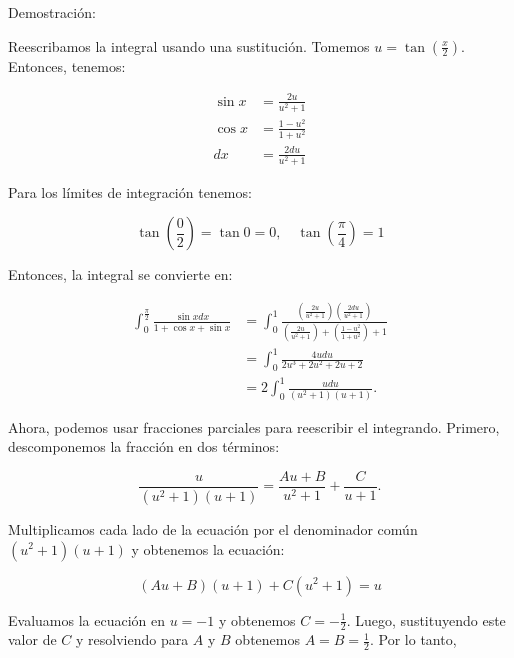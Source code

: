\documentclass{report}
\begin{document}
\begin{enumerate}
        Demostración:
        
        Reescribamos la integral usando una sustitución. Tomemos $u=\tan \left(\frac{x}{2}\right)$. Entonces, tenemos:
        
        $$
        \begin{aligned}
        \sin x & =\frac{2 u}{u^{2}+1} \\
        \cos x & =\frac{1-u^{2}}{1+u^{2}} \\
        d x & =\frac{2 d u}{u^{2}+1}
        \end{aligned}
        $$
        
        Para los límites de integración tenemos:
        
        $$
        \tan \left(\frac{0}{2}\right)=\tan 0=0, \quad \tan \left(\frac{\pi}{4}\right)=1
        $$
        
        Entonces, la integral se convierte en:
        
        $$
        \begin{aligned}
        \int_{0}^{\frac{\pi}{2}} \frac{\sin x d x}{1+\cos x+\sin x} & =\int_{0}^{1} \frac{\left(\frac{2 u}{u^{2}+1}\right)\left(\frac{2 d u}{u^{2}+1}\right)}{\left(\frac{2 u}{u^{2}+1}\right)+\left(\frac{1-u^{2}}{1+u^{2}}\right)+1} \\
        & =\int_{0}^{1} \frac{4 u d u}{2 u^{3}+2 u^{2}+2 u+2} \\
        & =2 \int_{0}^{1} \frac{u d u}{\left(u^{2}+1\right)(u+1)} .
        \end{aligned}
        $$
        
        Ahora, podemos usar fracciones parciales para reescribir el integrando. Primero, descomponemos la fracción en dos términos:
        
        $$
        \frac{u}{\left(u^{2}+1\right)(u+1)}=\frac{A u+B}{u^{2}+1}+\frac{C}{u+1} .
        $$
        
        Multiplicamos cada lado de la ecuación por el denominador común $(u^2+1)(u+1)$ y obtenemos la ecuación:
        
        $$
        (A u+B)(u+1)+C\left(u^{2}+1\right)=u
        $$
        
        Evaluamos la ecuación en $u=-1$ y obtenemos $C=-\frac{1}{2}$. Luego, sustituyendo este valor de $C$ y resolviendo para $A$ y $B$ obtenemos $A=B=\frac{1}{2}$. Por lo tanto,
        

\end{enumerate}
\end{document}
